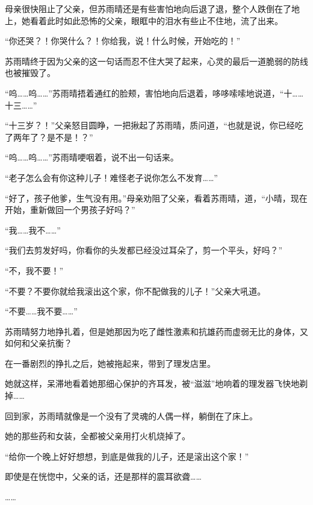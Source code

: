 母亲很快阻止了父亲，但苏雨晴还是有些害怕地向后退了退，整个人跌倒在了地上，她看着此时如此恐怖的父亲，眼眶中的泪水有些止不住地，流了出来。

“你还哭？！你哭什么？！你给我，说！什么时候，开始吃的！”

苏雨晴终于因为父亲的这一句话而忍不住大哭了起来，心灵的最后一道脆弱的防线也被摧毁了。

“呜……呜……”苏雨晴捂着通红的脸颊，害怕地向后退着，哆哆嗦嗦地说道，“十……十三……”

“十三岁？！”父亲怒目圆睁，一把揪起了苏雨晴，质问道，“也就是说，你已经吃了两年了？是不是！？”

“呜……呜……”苏雨晴哽咽着，说不出一句话来。

“老子怎么会有你这种儿子！难怪老子说你怎么不发育……”

“好了，孩子他爹，生气没有用。”母亲劝阻了父亲，看着苏雨晴，道，“小晴，现在开始，重新做回一个男孩子好吗？”

“我……我不……”

“我们去剪发好吗，你看你的头发都已经没过耳朵了，剪一个平头，好吗？”

“不，我不要！”

“不要？不要你就给我滚出这个家，你不配做我的儿子！”父亲大吼道。

“不要……我不要……”

苏雨晴努力地挣扎着，但是她那因为吃了雌性激素和抗雄药而虚弱无比的身体，又如何和父亲抗衡？

在一番剧烈的挣扎之后，她被拖起来，带到了理发店里。

她就这样，呆滞地看着她那细心保护的齐耳发，被“滋滋”地响着的理发器飞快地剃掉……

回到家，苏雨晴就像是一个没有了灵魂的人偶一样，躺倒在了床上。

她的那些药和女装，全都被父亲用打火机烧掉了。

“给你一个晚上好好想想，到底是做我的儿子，还是滚出这个家！”

即使是在恍惚中，父亲的话，还是那样的震耳欲聋……

……
